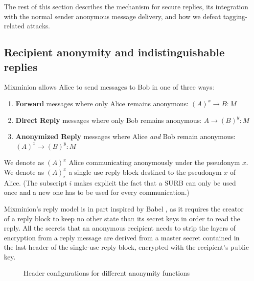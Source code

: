 \documentclass[11pt]{IEEEtran}
\begin{document}
The rest of this section describes the mechanism for secure replies,
its integration with the normal sender anonymous message delivery, and
how we defeat tagging-related attacks.  

\subsection{Recipient anonymity and indistinguishable replies}
\label{subsec:replies}
\label{subsec:header-swap}

Mixminion allows Alice to send messages to Bob in one of three ways:

\begin{enumerate}
\item \textbf{Forward} messages where only Alice remains anonymous:
$(A)^x \rightarrow B: M$
\item \textbf{Direct Reply} messages where only Bob remains anonymous:
$A \rightarrow (B)^y: M$
\item \textbf{Anonymized Reply} messages where Alice \emph{and} Bob
   remain anonymous: $(A)^x \rightarrow (B)^y: M$
\end{enumerate}

We denote as $(A)^x$ Alice communicating anonymously under the
pseudonym $x$. We denote as
$(A)^x_i$ a single use reply block destined to the pseudonym $x$ of
Alice. (The subscript $i$ makes explicit the fact that a SURB can only
be used once and a new one has to be used for every communication.)

Mixminion's reply model is in part inspired by Babel \cite{babel}, as it
requires the creator of a reply block to keep no other state than its secret
keys in order to read the reply.  All the secrets that an anonymous recipient
needs to strip the layers of encryption from a reply message are derived from
a master secret contained in the last header of the single-use reply block,
encrypted with the recipient's public key.

\begin{figure}
\begin{center}
\caption{Header configurations for different anonymity functions} 
\end{center}
\end{figure}
\end{document}
